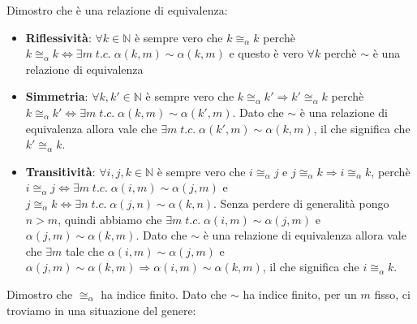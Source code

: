 \documentclass[12pt]{article}
\newcommand{\congAlpha}{\ensuremath{\cong_\alpha}\xspace}
\begin{document}
Dimostro che è una relazione di equivalenza:
\begin{itemize}
	\item \textbf{Riflessività}: $\forall k \in \mathbb{N}$ è sempre vero che $k\congAlpha k$ perchè $k\congAlpha k \Leftrightarrow \exists m\;t.c.\;\alpha(k,m)\sim\alpha(k,m)$ e questo è vero $\forall k$ perchè $\sim$ è una relazione di equivalenza
	\item \textbf{Simmetria}: $\forall k,k' \in \mathbb{N}$ è sempre vero che $k\congAlpha k' \Rightarrow k' \congAlpha k$ perchè $k\congAlpha k' \Leftrightarrow \exists m\;t.c.\;\alpha(k,m)\sim\alpha(k',m)$. Dato che $\sim$ è una relazione di equivalenza allora vale che $\exists m\;t.c.\;\alpha(k',m)\sim\alpha(k,m)$, il che significa che $k' \congAlpha k$.
	\item \textbf{Transitività}: $\forall i,j,k \in \mathbb{N}$ è sempre vero che $i\congAlpha j$ e $j\congAlpha k \Rightarrow i \congAlpha k$, perchè $i\congAlpha j \Leftrightarrow \exists m\;t.c.\;\alpha(i,m)\sim\alpha(j,m)$ e $j\congAlpha k \Leftrightarrow \exists n\;t.c.\;\alpha(j,n)\sim\alpha(k,n)$. Senza perdere di generalità pongo $n>m$, quindi abbiamo che $\exists m\;t.c.\;\alpha(i,m)\sim\alpha(j,m)$ e $\alpha(j,m)\sim\alpha(k,m)$. Dato che $\sim$ è una relazione di equivalenza allora vale che $\exists m$ tale che $\alpha(i,m)\sim\alpha(j,m)$ e $\alpha(j,m)\sim\alpha(k,m) \Rightarrow \alpha(i,m)\sim\alpha(k,m)$, il che significa che $i \congAlpha k$. 
\end{itemize}

Dimostro che $\congAlpha$ ha indice finito. Dato che $\sim$ ha indice finito, per un $m$ fisso, ci troviamo in una situazione del genere:
\end{document}
